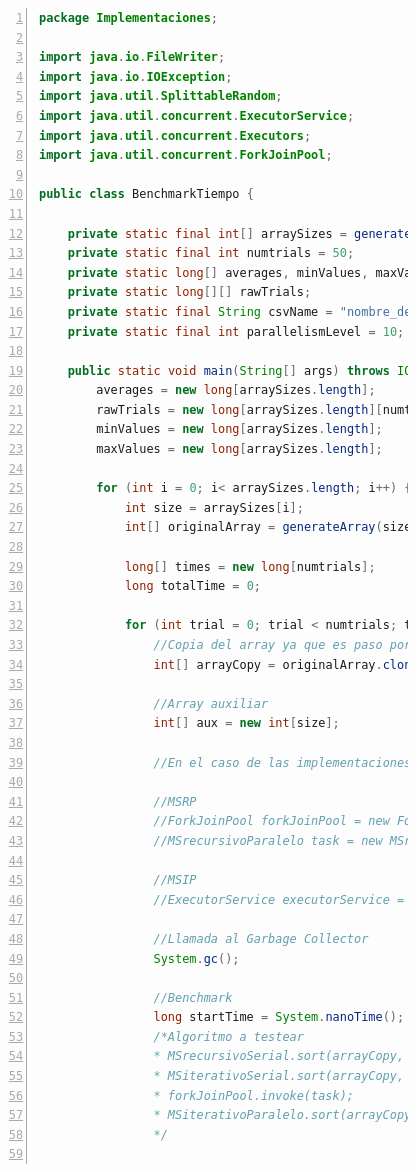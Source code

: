 \documentclass[titlepage]{article}
\begin{document}
\begin{figure}[h]
	\begin{lstlisting}[language=java, frame=single, numbers=left]
package Implementaciones;

import java.io.FileWriter;
import java.io.IOException;
import java.util.SplittableRandom;
import java.util.concurrent.ExecutorService;
import java.util.concurrent.Executors;
import java.util.concurrent.ForkJoinPool;

public class BenchmarkTiempo {
	
	private static final int[] arraySizes = generateSizes();
	private static final int numtrials = 50;
	private static long[] averages, minValues, maxValues;
	private static long[][] rawTrials;
	private static final String csvName = "nombre_del_benchmark_de_tiempo.csv";
	private static final int parallelismLevel = 10;
	
	public static void main(String[] args) throws IOException {
		averages = new long[arraySizes.length];
		rawTrials = new long[arraySizes.length][numtrials];
		minValues = new long[arraySizes.length];
		maxValues = new long[arraySizes.length];
		
		for (int i = 0; i< arraySizes.length; i++) {
			int size = arraySizes[i];
			int[] originalArray = generateArray(size);
			
			long[] times = new long[numtrials];
			long totalTime = 0;
			
			for (int trial = 0; trial < numtrials; trial++) {
				//Copia del array ya que es paso por referencia
				int[] arrayCopy = originalArray.clone();
				
				//Array auxiliar
				int[] aux = new int[size];
				
				//En el caso de las implementaciones paralelas:
				
				//MSRP
				//ForkJoinPool forkJoinPool = new ForkJoinPool(parallelismLevel);
				//MSrecursivoParalelo task = new MSrecursivoParaleloCustomThresh(arrayCopy, aux, 0, size-1);
				
				//MSIP
				//ExecutorService executorService = Executors.newFixedThreadPool(parallelismLevel);
				
				//Llamada al Garbage Collector
				System.gc();
				
				//Benchmark
				long startTime = System.nanoTime();
				/*Algoritmo a testear
				* MSrecursivoSerial.sort(arrayCopy, aux, 0, size-1);
				* MSiterativoSerial.sort(arrayCopy, aux);
				* forkJoinPool.invoke(task);
				* MSiterativoParalelo.sort(arrayCopy, aux, executorService);
				*/
				

\end{lstlisting}
\end{figure}
\end{document}
